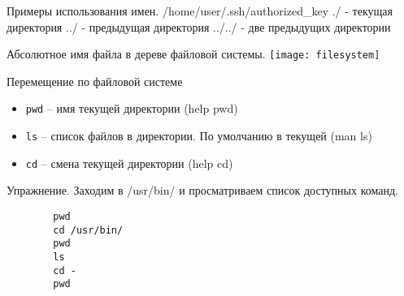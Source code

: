 \begin{frame}{Примеры использования имен.}
        /home/user/.ssh/authorized\_key
        \alert{./} - текущая директория
        \alert{../} - предыдущая директория
        \alert{../../} - две предыдущих директории
\end{frame}

\begin{frame}{Абсолютное имя файла в дереве файловой системы.}
\texttt{[image: filesystem]} 
\end{frame}

\begin{frame}[fragile]{Перемещение по файловой системе}
      \begin{itemize}
		  \item {\tt pwd} -- имя текущей директории (help pwd)
		  \item {\tt ls} -- список файлов в директории. По умолчанию в текущей (man ls)
		  \item {\tt cd} -- смена текущей директории (help cd)
      \end{itemize}
      \begin{block}{Упражнение. Заходим в /usr/bin/ и просматриваем список доступных команд.}
	\begin{lstlisting}
        pwd
        cd /usr/bin/
        pwd
        ls
        cd -
        pwd
\end{lstlisting}
      \end{block}
\end{frame}

%
%
%
%
%
%

